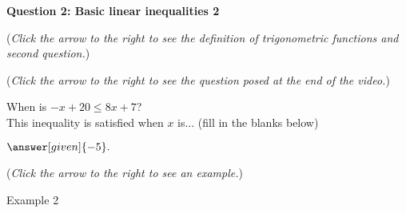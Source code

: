 \documentclass{ximera}
\begin{document}
\textbf{Question 2: Basic linear inequalities 2}
\begin{question}
\begin{flushright}
{\color{blue}(\emph{Click the arrow to the right to see the definition
of trigonometric functions and second question.})}
\end{flushright}
\begin{center}
\begin{expandable}
\begin{flushright}
{\color{blue}(\emph{Click the arrow to the right to see the question
posed at the end of the video.})}
\end{flushright}
\begin{expandable}
\begin{center}
When is $-x+20\leq 8x+7$? \\ This inequality is satisfied when $x$ is... (fill in the blanks below) \\
\end{center}
\begin{prompt}
\begin{center} 

 $\answer[given]{-5}.$\\
\end{center}
\end{prompt}
\begin{flushright}
{\color{blue}(\emph{Click the arrow to the right to see an example.})}
\end{flushright}
\begin{expandable}
\begin{center}
Example 2
\end{center}
\end{expandable}
\end{expandable}
\end{expandable}
\end{center}
\end{question}
\end{document}
